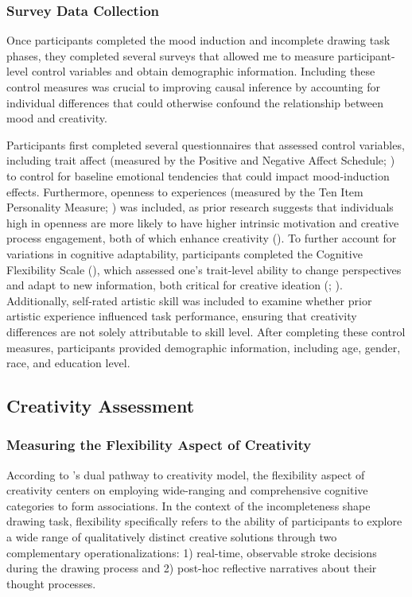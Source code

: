 \documentclass[../MA_Thesis.tex]{subfiles}
\begin{document}
\subsubsection*{Survey Data Collection}
Once participants completed the mood induction and incomplete drawing task phases, they completed several surveys that allowed me to measure participant-level control variables and obtain demographic information. Including these control measures was crucial to improving causal inference by accounting for individual differences that could otherwise confound the relationship between mood and creativity.

Participants first completed several questionnaires that assessed control variables, including trait affect (measured by the Positive and Negative Affect Schedule; \cite{watson_development_1988}) to control for baseline emotional tendencies that could impact mood-induction effects. Furthermore, openness to experiences (measured by the Ten Item Personality Measure; \cite{gosling_very_2003}) was included, as prior research suggests that individuals high in openness are more likely to have higher intrinsic motivation and creative process engagement, both of which enhance creativity (\cite{tan_openness_2019}). To further account for variations in cognitive adaptability, participants completed the Cognitive Flexibility Scale (\cite{martin_new_1995}), which assessed one's trait-level ability to change perspectives and adapt to new information, both critical for creative ideation (\cite{lin_how_2014}; \cite{muller_concentrative_2016}). Additionally, self-rated artistic skill was included to examine whether prior artistic experience influenced task performance, ensuring that creativity differences are not solely attributable to skill level. After completing these control measures, participants provided demographic information, including age, gender, race, and education level. 

\subsection*{Creativity Assessment}
\subsubsection*{Measuring the Flexibility Aspect of Creativity}
According to \textcite{nijstad_dual_2010}'s dual pathway to creativity model, the flexibility aspect of creativity centers on employing wide-ranging and comprehensive cognitive categories to form associations. In the context of the incompleteness shape drawing task, flexibility specifically refers to the ability of participants to explore a wide range of qualitatively distinct creative solutions through two complementary operationalizations: 1) real-time, observable stroke decisions during the drawing process and 2) post-hoc reflective narratives about their thought processes.
\end{document}
